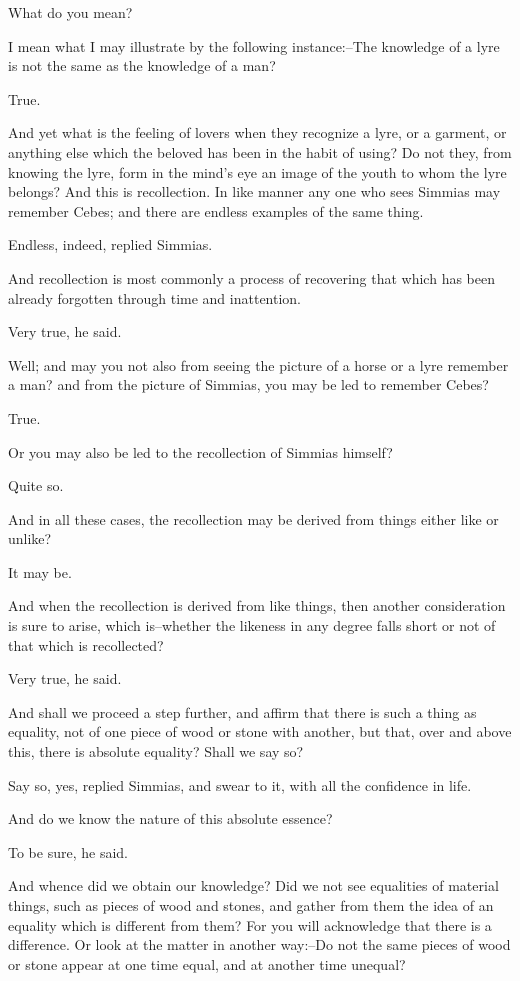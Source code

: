 What do you mean?

I mean what I may illustrate by the following instance:--The knowledge
of a lyre is not the same as the knowledge of a man?

True.

And yet what is the feeling of lovers when they recognize a lyre, or
a garment, or anything else which the beloved has been in the habit of
using? Do not they, from knowing the lyre, form in the mind's eye an
image of the youth to whom the lyre belongs? And this is recollection.
In like manner any one who sees Simmias may remember Cebes; and there
are endless examples of the same thing.

Endless, indeed, replied Simmias.

And recollection is most commonly a process of recovering that which has
been already forgotten through time and inattention.

Very true, he said.

Well; and may you not also from seeing the picture of a horse or a
lyre remember a man? and from the picture of Simmias, you may be led to
remember Cebes?

True.

Or you may also be led to the recollection of Simmias himself?

Quite so.

And in all these cases, the recollection may be derived from things
either like or unlike?

It may be.

And when the recollection is derived from like things, then another
consideration is sure to arise, which is--whether the likeness in any
degree falls short or not of that which is recollected?

Very true, he said.

And shall we proceed a step further, and affirm that there is such a
thing as equality, not of one piece of wood or stone with another, but
that, over and above this, there is absolute equality? Shall we say so?

Say so, yes, replied Simmias, and swear to it, with all the confidence
in life.

And do we know the nature of this absolute essence?

To be sure, he said.

And whence did we obtain our knowledge? Did we not see equalities of
material things, such as pieces of wood and stones, and gather from
them the idea of an equality which is different from them? For you will
acknowledge that there is a difference. Or look at the matter in another
way:--Do not the same pieces of wood or stone appear at one time equal,
and at another time unequal?

